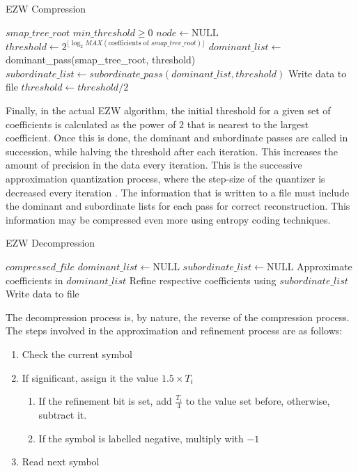 \documentclass[./A14_Report.tex]{subfiles}
\begin{document}
\begin{algorithm}[H]
    \caption{EZW Compression}
    \label{alg:ezw}
    \begin{algorithmic}
        \Require $smap\_tree\_root$ 
        \Require $min\_threshold \ge 0$
        \State $node \gets \text{NULL}$
        \State $threshold \gets 2^{\lfloor\log_2{MAX(\text{coefficients of } smap\_tree\_root)}\rfloor}$
            \State $dominant\_list \gets$ dominant\_pass(smap\_tree\_root, threshold)
            \State $subordinate\_list \gets subordinate\_pass(dominant\_list, threshold)$
            \State Write data to file
            \State $threshold \gets threshold/2$
        \EndWhile
    \end{algorithmic}
\end{algorithm}

Finally, in the actual EZW algorithm, the initial threshold for a given set of
coefficients is calculated as the power of $2$ that is nearest to the largest
coefficient. Once this is done, the dominant and subordinate passes are called
in succession, while halving the threshold after each iteration. This increases
the amount of precision in the data every iteration. This is the successive
approximation quantization process, where the step-size of the quantizer is
decreased every iteration \cite{shap1993}. The information that is written to a
file must include the dominant and subordinate lists for each pass for correct
reconstruction. This information may be compressed even more using entropy
coding techniques.

\begin{algorithm}[H]
    \caption{EZW Decompression}
    \label{alg:ezwdecomp}
    \begin{algorithmic}
        \Require $compressed\_file$
        \State $dominant\_list \gets \text{NULL}$
        \State $subordinate\_list \gets \text{NULL}$
            \State Approximate coefficients in $dominant\_list$
            \State Refine respective coefficients using $subordinate\_list$
            \State Write data to file
        \EndFor
    \end{algorithmic}
\end{algorithm}

The decompression process is, by nature, the reverse of the compression
process. The steps involved in the approximation and refinement process are as
follows:
\begin{enumerate}
    \item{Check the current symbol}
    \item{If significant, assign it the value $1.5 \times T_i$}
        \begin{enumerate}
            \item{If the refinement bit is set, add $\frac{T_i}{4}$ to the
                value set before, otherwise, subtract it.}
            \item{If the symbol is labelled negative, multiply with $-1$}
        \end{enumerate}
    \item{Read next symbol}
\end{enumerate}
\end{document}
